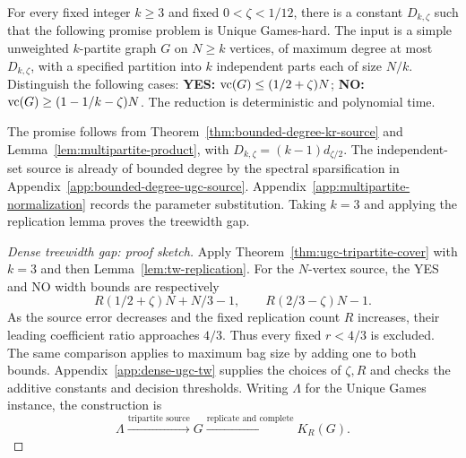 \begin{theorem}
\label{thm:ugc-tripartite-cover}
For every fixed integer $k\geq3$ and fixed
$0<\zeta<1/12$, there is a constant $D_{k,\zeta}$ such that the
following promise problem is Unique Games-hard. The input is a
simple unweighted $k$-partite graph $G$ on $N\geq k$ vertices, of maximum
degree at most $D_{k,\zeta}$, with a specified partition into $k$
independent parts each of size $N/k$. Distinguish the following cases:
\textbf{YES:} $\operatorname{vc}(G)\leq(1/2+\zeta)N$;
\textbf{NO:} $\operatorname{vc}(G)\geq(1-1/k-\zeta)N$.
The reduction is deterministic and polynomial time.
\end{theorem}

The promise follows from Theorem~\ref{thm:bounded-degree-kr-source} and
Lemma~\ref{lem:multipartite-product}, with
$D_{k,\zeta}=(k-1)d_{\zeta/2}$. The independent-set source is already
of bounded degree by the spectral sparsification in
Appendix~\ref{app:bounded-degree-ugc-source}.
Appendix~\ref{app:multipartite-normalization} records the parameter
substitution. Taking $k=3$ and applying the
replication lemma proves the treewidth gap.



\begin{proof}[Dense treewidth gap: proof sketch]
Apply Theorem~\ref{thm:ugc-tripartite-cover} with $k=3$ and then
Lemma~\ref{lem:tw-replication}. For the $N$-vertex source, the
YES and NO width bounds are respectively
\[
 R(1/2+\zeta)N+N/3-1,\qquad R(2/3-\zeta)N-1.
\]
As the source error decreases and the fixed replication count $R$
increases, their leading coefficient ratio approaches $4/3$.
Thus every fixed $r<4/3$ is excluded. The same comparison applies
to maximum bag size by adding one to both bounds.
Appendix~\ref{app:dense-ugc-tw} supplies the choices of $\zeta,R$
and checks the additive constants and decision thresholds.
Writing $\Lambda$ for the Unique Games instance, the construction is
\[
 \Lambda\xrightarrow{\text{tripartite source}}G
 \xrightarrow{\text{replicate and complete}}K_R(G).
\]
\end{proof}
